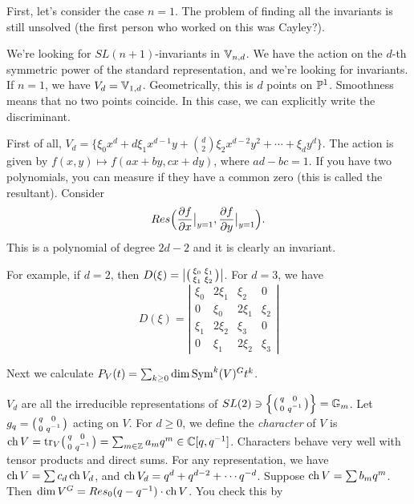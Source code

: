 First, let's consider the case $n=1$. The problem of finding all the invariants is still unsolved (the first person who worked on this was Cayley?). 


We're looking for $SL(n+1)$-invariants in $\mathbb{V}_{n,d}$. We have the action on the $d$-th symmetric power of the standard representation, and we're looking for invariants. If $n=1$, we have $V_d=\mathbb{V}_{1,d}$. Geometrically, this is $d$ points on $\mathbb{P}^1$. Smoothness means that no two points coincide. In this case, we can explicitly write the discriminant.

First of all, $V_d=\{\xi_0 x^d+d\xi_1 x^{d-1}y+\binom d2 \xi_2x^{d-2}y^2+\cdots +\xi_d y^d\}$. The action is given by $f(x,y)\mapsto f(ax+by,cx+dy)$, where $ad-bc=1$. If you have two polynomials, you can measure if they have a common zero (this is called the resultant). Consider
\[
 Res\Bigl(\frac{\partial f}{\partial x} \bigr|_{y=1}, \frac{\partial f}{\partial y}\bigr|_{y=1} \Bigr).
\]
This is a polynomial of degree $2d-2$ and it is clearly an invariant. 

For example, if $d=2$, then $D(\xi)=\bigl|\bigl(\begin{smallmatrix} \xi_0& \xi_1\\ \xi_1& \xi_2 \end{smallmatrix}\bigr)\bigr|$. For $d=3$, we have
\[
 D(\xi) = \left|
 \begin{matrix}
  \xi_0& 2\xi_1&\xi_2& 0\\
  0& \xi_0& 2\xi_1 & \xi_2\\
  \xi_1 & 2\xi_2 & \xi_3 & 0\\
  0& \xi_1& 2\xi_2 & \xi_3
 \end{matrix}\right|
\]

Next we calculate $P_V(t)=\sum_{k\ge 0} \dim \operatorname{Sym}^k(V)^G t^k$.
 

$V_d$ are all the irreducible representations of $SL(2)\ni \Bigl\{\bigl(\begin{smallmatrix} q&0\\ 0&q^{-1} \end{smallmatrix}\bigr)\Bigr\}=\mathbb{G}_m$. Let $g_q=\bigl(\begin{smallmatrix} q&0\\ 0&q^{-1} \end{smallmatrix}\bigr)$ acting on $V$. For $d\ge 0$, we define the \emph{character} of $V$ is $\operatorname{ch} V=\operatorname{tr}_V\bigl(\begin{smallmatrix} q&0\\ 0&q^{-1} \end{smallmatrix}\bigr)=\sum_{m\in\mathbb{Z}} a_m q^m\in \mathbb{C}[q,q^{-1}]$. Characters behave very well with tensor products and direct sums. For any representation, we have $\operatorname{ch} V=\sum c_d \operatorname{ch} V_d$, and $\operatorname{ch} V_d=q^d+q^{d-2}+\cdots q^{-d}$. Suppose $\operatorname{ch} V=\sum b_m q^m$. Then $\dim V^G=Res_0(q-q^{-1})\cdot \operatorname{ch} V$. You check this by \anton{}

